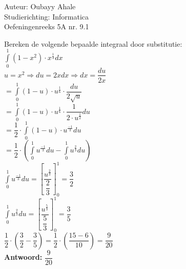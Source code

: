 \documentclass[a4paper]{article}
\newcommand{\dint}{\displaystyle\int}
\begin{document}
  
\noindent \large Auteur: Oubayy Ahale         \\
\noindent \large Studierichting: Informatica  \\
\noindent \large Oefeningenreeks 5A nr. 9.1   \\

\medskip

\normalsize

Bereken de volgende bepaalde integraal door substitutie:\\

$ \dint\limits_{0}^{1} (1 - x^2) \cdot x^{\tfrac{1}{3}} dx$ \\

$ u = x^2 \Rightarrow du = 2x dx \Rightarrow dx = \dfrac{du}{2x} $\\

$ = \dint\limits_{0}^{1} (1 - u) \cdot u^{\tfrac{1}{6}} \cdot \dfrac{du}{2\sqrt{u}} $\\

$ = \dint\limits_{0}^{1} (1 - u) \cdot u^{\tfrac{1}{6}} \cdot \dfrac{1}{2 \cdot u^{\tfrac{1}{2}}} du $\\

$ = \dfrac{1}{2} \cdot \dint\limits_{0}^{1} (1 - u) \cdot u^{\tfrac{-1}{3}} du $\\

$ = \dfrac{1}{2} \cdot \left( \dint\limits_{0}^{1} u^{\tfrac{-1}{3}} du - \dint\limits_{0}^{1} u^{\tfrac{2}{3}} du \right) $\\


$ \dint\limits_{0}^{1} u^{\tfrac{-1}{3}} du = \left[ \dfrac{u^{\tfrac{2}{3}}}{\dfrac{2}{3}} \right]_{0}^{1} = \dfrac{3}{2} $\\

$ \dint\limits_{0}^{1} u^{\tfrac{2}{3}} du = \left[ \dfrac{u^{\tfrac{5}{3}}}{\dfrac{5}{3}} \right]_{0}^{1} = \dfrac{3}{5} $\\

$\dfrac{1}{2} \cdot \left( \dfrac{3}{2} - \dfrac{3}{5} \right) = \dfrac{1}{2} \cdot \left( \dfrac{15 - 6}{10} \right) = \dfrac{9}{20}$\\

\textbf{Antwoord:} $\boxed{\dfrac{9}{20}}$\\
\end{document}
